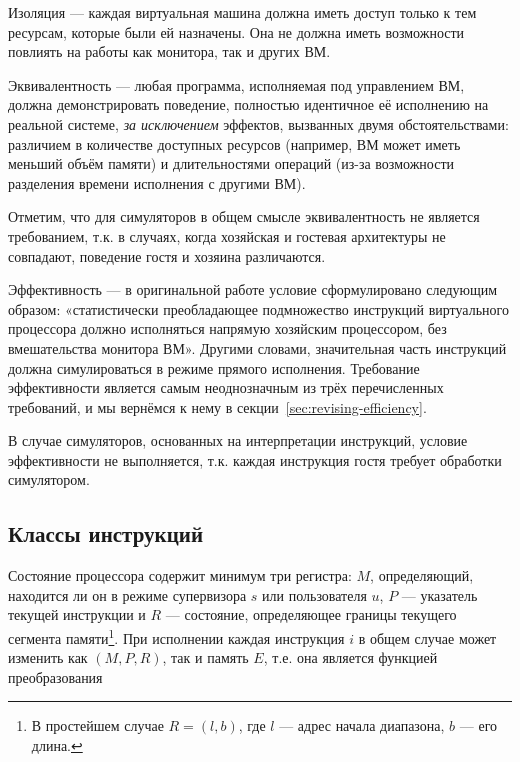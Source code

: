 \begin{description*}

\item[Изоляция] — каждая виртуальная машина должна иметь доступ только к тем ресурсам, которые были ей назначены. Она не должна иметь возможности повлиять на работы как монитора, так и других ВМ.

\item[Эквивалентность] — любая программа, исполняемая под управлением ВМ, должна демонстрировать поведение, полностью идентичное её исполнению на реальной системе, \emph{за исключением} эффектов, вызванных двумя обстоятельствами: различием в количестве доступных ресурсов (например, ВМ может иметь меньший объём памяти) и длительностями операций (из-за возможности разделения времени исполнения с другими ВМ).

Отметим, что для симуляторов в общем смысле эквивалентность не является требованием, т.к. в случаях, когда хозяйская и гостевая архитектуры не совпадают, поведение гостя и хозяина различаются.

\item[Эффективность] — в оригинальной работе условие сформулировано следующим образом: «статистически преобладающее подмножество инструкций виртуального процессора должно исполняться напрямую хозяйским процессором, без вмешательства монитора ВМ». Другими словами, значительная часть инструкций должна симулироваться в режиме прямого исполнения. Требование эффективности является самым неоднозначным из трёх перечисленных требований, и мы вернёмся к нему в секции~\ref{sec:revising-efficiency}.

В случае симуляторов, основанных на интерпретации инструкций, условие эффективности не выполняется, т.к. каждая инструкция гостя требует обработки симулятором.

\end{description*}

\subsection{Классы инструкций}

Состояние процессора содержит минимум три регистра: $M$, определяющий, находится ли он в режиме супервизора $s$ или пользователя $u$, $P$ — указатель текущей инструкции и $R$ — состояние, определяющее границы текущего сегмента памяти\footnote{В простейшем случае $R=(l,b)$, где $l$ — адрес начала диапазона, $b$ — его длина.}. При исполнении каждая инструкция $i$ в общем случае может изменить как $(M,P,R)$, так и память $E$, т.е. она является функцией преобразования 

